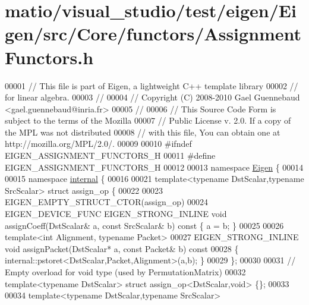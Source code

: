 \hypertarget{matio_2visual__studio_2test_2eigen_2_eigen_2src_2_core_2functors_2_assignment_functors_8h_source}{}\section{matio/visual\+\_\+studio/test/eigen/\+Eigen/src/\+Core/functors/\+Assignment\+Functors.h}
\label{matio_2visual__studio_2test_2eigen_2_eigen_2src_2_core_2functors_2_assignment_functors_8h_source}

\begin{DoxyCode}
00001 \textcolor{comment}{// This file is part of Eigen, a lightweight C++ template library}
00002 \textcolor{comment}{// for linear algebra.}
00003 \textcolor{comment}{//}
00004 \textcolor{comment}{// Copyright (C) 2008-2010 Gael Guennebaud <gael.guennebaud@inria.fr>}
00005 \textcolor{comment}{//}
00006 \textcolor{comment}{// This Source Code Form is subject to the terms of the Mozilla}
00007 \textcolor{comment}{// Public License v. 2.0. If a copy of the MPL was not distributed}
00008 \textcolor{comment}{// with this file, You can obtain one at http://mozilla.org/MPL/2.0/.}
00009 
00010 \textcolor{preprocessor}{#ifndef EIGEN\_ASSIGNMENT\_FUNCTORS\_H}
00011 \textcolor{preprocessor}{#define EIGEN\_ASSIGNMENT\_FUNCTORS\_H}
00012 
00013 \textcolor{keyword}{namespace }\hyperlink{namespace_eigen}{Eigen} \{
00014 
00015 \textcolor{keyword}{namespace }\hyperlink{namespaceinternal}{internal} \{
00016   
00021 \textcolor{keyword}{template}<\textcolor{keyword}{typename} DstScalar,\textcolor{keyword}{typename} SrcScalar> \textcolor{keyword}{struct }assign\_op \{
00022 
00023   EIGEN\_EMPTY\_STRUCT\_CTOR(assign\_op)
00024   EIGEN\_DEVICE\_FUNC EIGEN\_STRONG\_INLINE \textcolor{keywordtype}{void} assignCoeff(DstScalar& a, \textcolor{keyword}{const} SrcScalar& b)\textcolor{keyword}{ const }\{ a = b; \}
00025   
00026   \textcolor{keyword}{template}<\textcolor{keywordtype}{int} Alignment, \textcolor{keyword}{typename} Packet>
00027   EIGEN\_STRONG\_INLINE \textcolor{keywordtype}{void} assignPacket(DstScalar* a, \textcolor{keyword}{const} Packet& b)\textcolor{keyword}{ const}
00028 \textcolor{keyword}{  }\{ internal::pstoret<DstScalar,Packet,Alignment>(a,b); \}
00029 \};
00030 
00031 \textcolor{comment}{// Empty overload for void type (used by PermutationMatrix)}
00032 \textcolor{keyword}{template}<\textcolor{keyword}{typename} DstScalar> \textcolor{keyword}{struct }assign\_op<DstScalar,void> \{\};
00033 
00034 \textcolor{keyword}{template}<\textcolor{keyword}{typename} DstScalar,\textcolor{keyword}{typename} SrcScalar>

\end{DoxyCode}

